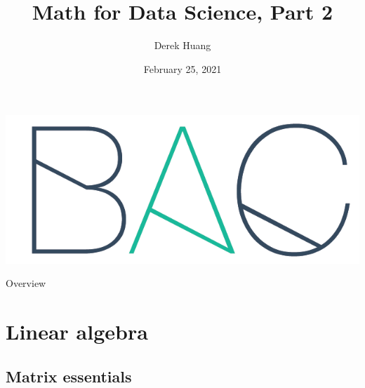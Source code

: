 \documentclass{beamer}
\title[Math for Data Science, Part 2]{Math for Data Science, Part 2}
\author[Derek Huang (BAC Advanced Team)]{Derek Huang}
\institute{BAC Advanced Team}
\date{February 25, 2021}
\numberwithin{equation}{section}
\begin{document}
\begin{frame}
    \titlepage
    \centering
    \includegraphics[scale = 0.1]{../bac_logo1.png}
\end{frame}

\begin{frame}{Overview}
    \tableofcontents
\end{frame}

\section{Linear algebra}

\subsection{Matrix essentials}
\end{document}
